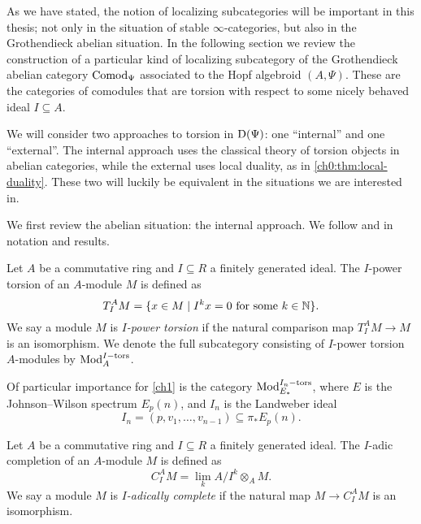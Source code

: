 As we have stated, the notion of localizing subcategories will be important in this thesis; not only in the situation of stable $\infty$-categories, but also in the Grothendieck abelian situation. In the following section we review the construction of a particular kind of localizing subcategory of the Grothendieck abelian category $\mathrm{Comod}_\Psi$ associated to the Hopf algebroid $(A,\Psi)$. These are the categories of comodules that are torsion with respect to some nicely behaved ideal $I\subseteq A$. 

We will consider two approaches to torsion in $\mathrm{D}(\Psi)$: one ``internal'' and one ``external''. The internal approach uses the classical theory of torsion objects in abelian categories, while the external uses local duality, as in \cref{ch0:thm:local-duality}. These two will luckily be equivalent in the situations we are interested in. 

We first review the abelian situation: the internal approach. We follow \cite{barthel-heard-valenzuela_2018} and \cite{barthel-heard-valenzuela_2020} in notation and results. 

\begin{definition}
    \label{def:I-power-torsion-module}
    Let $A$ be a commutative ring and $I\subseteq R$ a finitely generated ideal. The $I$-power torsion of an $A$-module $M$ is defined as
    \[T_I^A M = \{x\in M \mid I^k x = 0 \text{ for some } k\in \mathbb{N}\}.\]
    We say a module $M$ is \emph{$I$-power torsion} if the natural comparison map $T_I^A M\longrightarrow M$ is an isomorphism. We denote the full subcategory consisting of $I$-power torsion $A$-modules by $\mathrm{Mod}_A^{I-\mathrm{tors}}$. 
\end{definition}

\begin{example}
    Of particular importance for \cref{ch1} is the category $\mathrm{Mod}_{E_*}^{I_n-\mathrm{tors}}$, where $E$ is the Johnson--Wilson spectrum $E_p(n)$, and $I_n$ is the Landweber ideal 
    \[I_n = (p, v_1, \ldots, v_{n-1})\subseteq \pi_* E_p(n).\]
\end{example}

\begin{definition}
    Let $A$ be a commutative ring and $I\subseteq R$ a finitely generated ideal. The $I$-adic completion of an $A$-module $M$ is defined as
    \[C_I^A M = \lim_k A/I^k\otimes_A M.\]
    We say a module $M$ is \emph{$I$-adically complete} if the natural map $M\longrightarrow C_I^A M$ is an isomorphism. 
\end{definition}

